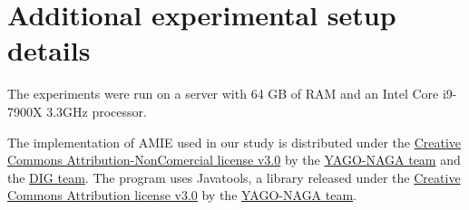 \section{Additional experimental setup details}
The experiments were run on a server with 64 GB of RAM and an Intel Core i9-7900X 3.3GHz processor.

The implementation of AMIE used in our study is distributed under the \hyperlink{https://creativecommons.org/licenses/by-nc/3.0/}{Creative Commons Attribution-NonComercial license v3.0} by the \hyperlink{https://www.mpi-inf.mpg.de/departments/databases-and-information-systems/research/yago-naga/amie/}{YAGO-NAGA team} and the \hyperlink{https://dig.telecom-paris.fr/blog/}{DIG team}. The program uses Javatools, a library released under the \hyperlink{https://creativecommons.org/licenses/by/3.0/}{Creative Commons Attribution license v3.0} by the \hyperlink{https://www.mpi-inf.mpg.de/departments/databases-and-information-systems/research/yago-naga/amie/}{YAGO-NAGA team}.
